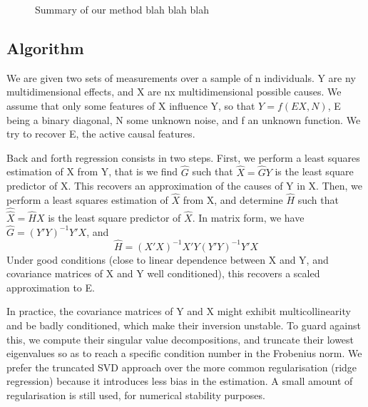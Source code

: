 \documentclass{article}
\begin{document}
\begin{figure}[t!]
    \caption{Summary of our method blah blah blah}
    \label{fig:}
\end{figure}


\subsection{Algorithm}

We are given two sets of measurements over a sample of n individuals.
%
%
Y are ny multidimensional effects, and X are nx multidimensional possible causes.
%
We assume that only some features of X influence Y, so that $Y=f(EX,N)$, E being a binary diagonal, N some unknown noise, and f an unknown function.
%
We try to recover E, the active causal features.

Back and forth regression consists in two steps.
%
First, we perform a least squares estimation of X from Y, that is we find $\hat G$ such that $\hat X=\hat G Y$ is the least square predictor of X.
%
This recovers an approximation of the causes of Y in X.
%
Then, we perform a least squares estimation of $\hat X$ from X, and determine $\hat H$ such that $\hat {\hat X}=\hat H X$ is the least square predictor of $\hat X$.
%
In matrix form, we have $\hat G=(Y'Y)^{-1} Y'X$, and
\begin{equation} \hat H=(X'X)^{-1} X'Y(Y'Y)^{-1} Y'X\end{equation}
Under good conditions (close to linear dependence between X and Y, and covariance matrices of X and Y well conditioned), this recovers a scaled approximation to E.

In practice, the covariance matrices of Y and X might exhibit multicollinearity and be badly conditioned, which make their inversion unstable. To guard against this, we compute their singular value decompositions, and truncate their lowest eigenvalues so as to reach a specific condition number in the Frobenius norm. We prefer the truncated SVD approach over the more common regularisation (ridge regression) because it introduces less bias in the estimation. A small amount of regularisation is still used, for numerical stability purposes.
\end{document}
